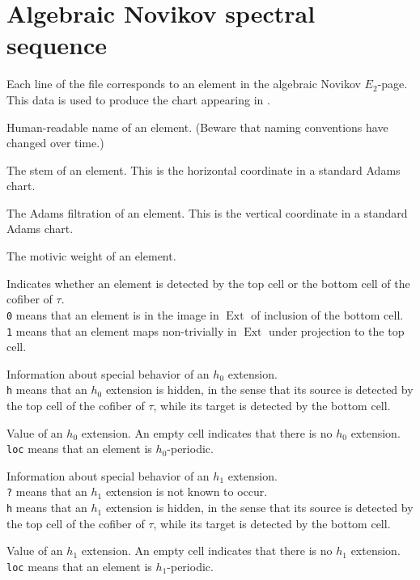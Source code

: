 \documentclass{amsart}
\DeclareMathOperator{\Ext}{Ext}
\begin{document}
\newpage

\section{Algebraic Novikov spectral sequence}

Each line of the file corresponds to an element in the
algebraic Novikov $E_2$-page.
This data is used to produce the chart appearing in \cite{IWX19a}.

  Human-readable name of an element.
(Beware that naming conventions have changed over time.)

 The stem of an element.  This is the
horizontal coordinate in a standard Adams chart.

 The Adams filtration of 
an element.  This is the vertical coordinate in a standard 
Adams chart.

 The motivic weight of an element.

 Indicates whether an element is detected by the top cell
or the bottom cell of the cofiber of $\tau$. \\
\texttt{0} means that an element is in the image in $\Ext$ of inclusion of the bottom cell.\\
\texttt{1} means that an element maps non-trivially in $\Ext$
under projection to the top cell.

Information about special behavior of an $h_0$ extension. \\
\texttt{h} means that an $h_0$ extension is hidden, in the sense
that its source is detected by the top cell of the cofiber of $\tau$,
while its target is detected by the bottom cell.

Value of an $h_0$ extension.  An empty cell indicates
that there is no $h_0$ extension. \\
\texttt{loc} means that an element is $h_0$-periodic.

Information about special behavior of an $h_1$ extension. \\
\texttt{?} means that an $h_1$ extension is not known to occur. \\
\texttt{h} means that an $h_1$ extension is hidden, in the sense
that its source is detected by the top cell of the cofiber of $\tau$,
while its target is detected by the bottom cell.

Value of an $h_1$ extension.  An empty cell indicates
that there is no $h_1$ extension. \\
\texttt{loc} means that an element is $h_1$-periodic.
\end{document}

